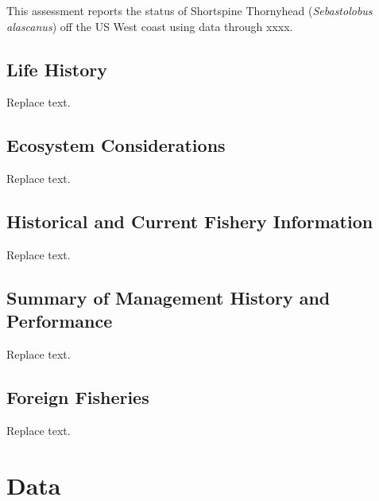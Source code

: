 \documentclass[11pt,
  english,
  letterpaper,
]{article}
\begin{document}
This assessment reports the status of Shortspine Thornyhead (\emph{Sebastolobus alascanus}) off the US West coast using data through xxxx.

\hypertarget{life-history}{%
\subsection{Life History}\label{life-history}}

Replace text.

\hypertarget{ecosystem-considerations-1}{%
\subsection{Ecosystem Considerations}\label{ecosystem-considerations-1}}

Replace text.

\hypertarget{historical-and-current-fishery-information}{%
\subsection{Historical and Current Fishery Information}\label{historical-and-current-fishery-information}}

Replace text.

\hypertarget{summary-of-management-history-and-performance}{%
\subsection{Summary of Management History and Performance}\label{summary-of-management-history-and-performance}}

Replace text.

\hypertarget{foreign-fisheries}{%
\subsection{Foreign Fisheries}\label{foreign-fisheries}}

Replace text.

\hypertarget{data}{%
\section{Data}\label{data}}
\end{document}
